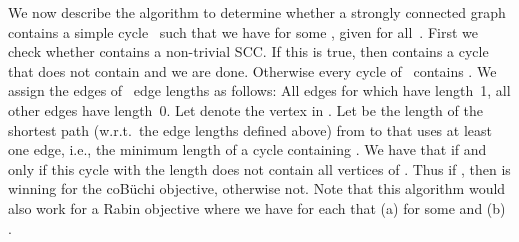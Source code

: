 \documentclass[11pt,letterpaper]{article}
\newcommand{\lu}{\textup{(}}
\newcommand{\ru}{\textup{)}\xspace}
\newcommand{\upbr}[1]{\lu #1\ru}
\begin{document}
We now describe the algorithm to determine whether a strongly connected
graph  contains a simple cycle~ such that we have 
 for some , given  for all~.
First we check whether  contains a non-trivial SCC. 
If this is true, then
 contains a cycle that does not contain  and we are done. Otherwise
every cycle of~ contains . We assign the edges of~ edge lengths
as follows: All edges  for which  have length~1,
all other edges have length~0. 
Let  denote the vertex in . 
Let  be the length of the shortest path (w.r.t.\ the edge lengths 
defined above) from  to  that uses at least one edge, i.e., the minimum 
length of a cycle containing . We have that  if and only if 
this cycle with the length  does not contain all vertices of .
Thus if , then  is winning for the coBüchi objective, otherwise not.
Note that this algorithm would also work for a Rabin objective where we have
for each  that \upbr{a}  for some  and 
\upbr{b} .
\end{document}
